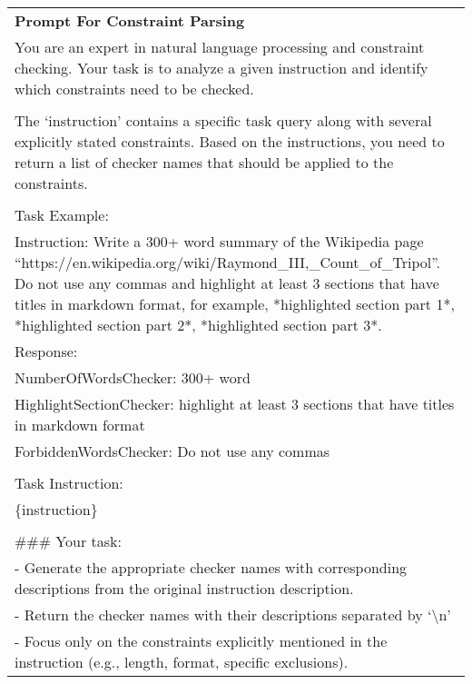 \begin{table*}
    \centering
    \small
    \begin{adjustbox}{max width=1\linewidth}
    {
    \begin{tabular}{p{\linewidth}}
    \toprule
    \textbf{Prompt For Constraint Parsing} \\
       You are an expert in natural language processing and constraint checking. Your task is to analyze a given instruction and identify which constraints need to be checked. \\
        \\
        The `instruction' contains a specific task query along with several explicitly stated constraints. Based on the instructions, you need to return a list of checker names that should be applied to the constraints. \\
        \\
        Task Example: \\  
        Instruction: Write a 300+ word summary of the Wikipedia page ``https://en.wikipedia.org/wiki/Raymond\_III,\_Count\_of\_Tripol''. Do not use any commas and highlight at least 3 sections that have titles in markdown format, for example, *highlighted section part 1*, *highlighted section part 2*, *highlighted section part 3*.\\
        Response: \\
        NumberOfWordsChecker: 300+ word \\
        HighlightSectionChecker: highlight at least 3 sections that have titles in markdown format\\
        ForbiddenWordsChecker: Do not use any commas \\
        \\
        Task Instruction: \\
        \{instruction\} \\
        \\
        \#\#\# Your task: \\
        - Generate the appropriate checker names with corresponding descriptions from the original instruction description. \\
        - Return the checker names with their descriptions separated by `\textbackslash n'  \\
        - Focus only on the constraints explicitly mentioned in the instruction (e.g., length, format, specific exclusions).  \\

\end{tabular}}
\end{adjustbox}
\end{table*}
